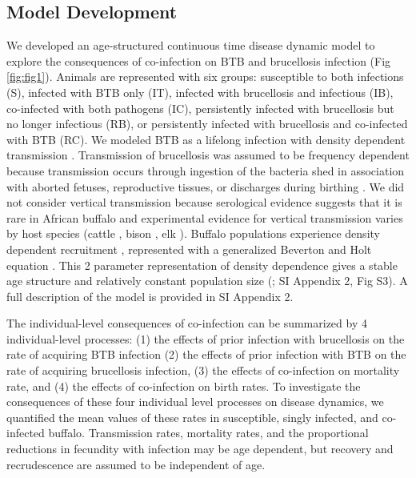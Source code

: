 \documentclass[10pt,letterpaper]{article}
\begin{document}
\subsection*{Model Development}
We developed an age-structured continuous time disease dynamic model to explore the consequences of co-infection on BTB and brucellosis infection (Fig \ref{fig:fig1}).
Animals are represented with six groups: susceptible to both infections (S), infected with BTB only (IT), infected with brucellosis and infectious (IB), co-infected with both pathogens (IC), persistently infected with brucellosis but no longer infectious (RB), or persistently infected with brucellosis and co-infected with BTB (RC). We modeled BTB as a lifelong infection with density dependent transmission \cite{jolles_interactions_2008}. 
Transmission of brucellosis was assumed to be frequency dependent because transmission occurs through ingestion of the bacteria shed in association with aborted fetuses, reproductive tissues, or discharges during birthing \cite{samartino_pathogenesis_1993}. 
We did not consider vertical transmission because serological evidence suggests that it is rare in African buffalo \cite{gorsich_context-dependent_2015} and experimental evidence for vertical transmission varies by host species (cattle \cite{fensterbank_congenital_1978}, bison \cite{plommet_brucellose_1973}, elk \cite{thorne_brucellosis_1978}). Buffalo populations experience density dependent recruitment \cite{sinclair_resource_1975}, represented with a generalized Beverton and Holt equation \cite{getz_hypothesis_1996}.
This 2 parameter representation of density dependence gives a stable age structure and relatively constant population size (\cite{cross_assessing_2006}; SI Appendix 2, Fig S3). A full description of the model is provided in SI Appendix 2.


The individual-level consequences of co-infection can be summarized by 4 individual-level processes: (1) the effects of prior infection with brucellosis on the rate of acquiring BTB infection (2) the effects of prior infection with BTB on the rate of acquiring brucellosis infection, (3) the effects of co-infection on mortality rate, and (4) the effects of co-infection on birth rates. 
To investigate the consequences of these four individual level processes on disease dynamics, we quantified the mean values of these rates in susceptible, singly infected, and co-infected buffalo. 
Transmission rates, mortality rates, and the proportional reductions in fecundity with infection may be age dependent, but recovery and recrudescence are assumed to be independent of age.
\end{document}
